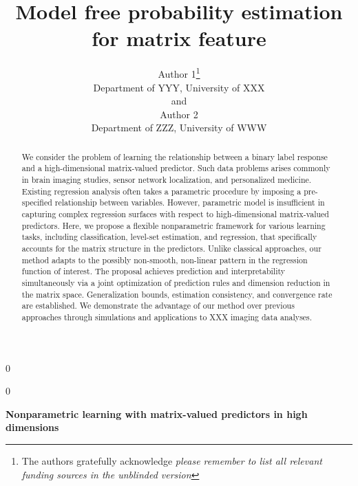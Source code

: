 \documentclass[12pt]{article}
\newcommand{\blind}{0}
\begin{document}
\setcounter{secnumdepth}{3}
%

\def\spacingset#1{\renewcommand{\baselinestretch}%
{#1}\small\normalsize} \spacingset{1}



\blind
{
  \title{\bf Model free probability estimation for matrix feature}
  \author{Author 1\thanks{
    The authors gratefully acknowledge \textit{please remember to list all relevant funding sources in the unblinded version}}\hspace{.2cm}\\
    Department of YYY, University of XXX\\
    and \\
    Author 2 \\
    Department of ZZZ, University of WWW}
  \maketitle
} \fi

\blind
{
  \bigskip
  \bigskip
  \bigskip
  \begin{center}
    {\LARGE\bf Nonparametric learning with matrix-valued predictors in high dimensions}
\end{center}
  \medskip
} \fi

\bigskip
\begin{abstract}
We consider the problem of learning the relationship between a binary label response and a high-dimensional matrix-valued predictor. Such data problems arises commonly in brain imaging studies, sensor network localization, and personalized medicine. Existing regression analysis often takes a parametric procedure by imposing a pre-specified relationship between variables. However, parametric model is insufficient in capturing complex regression surfaces with respect to high-dimensional matrix-valued predictors. Here, we propose a flexible nonparametric framework for various learning tasks, including classification, level-set estimation, and regression, that specifically accounts for the matrix structure in the predictors. Unlike classical approaches, our method adapts to the possibly non-smooth, non-linear pattern in the regression function of interest. The proposal achieves prediction and interpretability simultaneously via a joint optimization of prediction rules and dimension reduction in the matrix space. Generalization bounds, estimation consistency, and convergence rate are established. We demonstrate the advantage of our method over previous approaches through simulations and applications to XXX imaging data analyses. 
\end{abstract}
\end{document}
